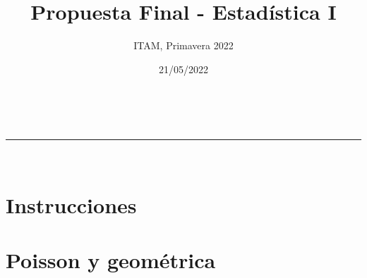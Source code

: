 \documentclass[addpoints]{exam}
\makeatletter
\newcommand{\linia}{\rule{\linewidth}{0.5pt}}
\theoremstyle{mytheor}
\renewcommand{\maketitle}{
    \begin{center}
    \vspace{2ex}
    {\huge \textsc{\@title}}
    \vspace{1ex}
    \\
    \linia\\
    \@author \hfill \@date
    \vspace{4ex}
    \end{center}
  }
\makeatother
\begin{document}
  
  \title{Propuesta Final - Estadística I}
  
  \author{ITAM, Primavera 2022}
  
  \date{21/05/2022}
  
  \maketitle
  
  \section*{Instrucciones}
  
\vspace{10pt}
  

  
  \section*{Poisson y geométrica}
  
\end{document}
